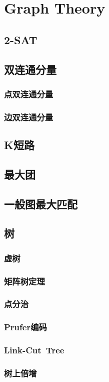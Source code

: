 \chapter{Graph Theory}
\section{2-SAT}
\section{双连通分量}
\subsection{点双连通分量}
\subsection{边双连通分量}
\section{K短路}
\section{最大团}
\section{一般图最大匹配}
\section{树}
\subsection{虚树}
\subsection{矩阵树定理}
\subsection{点分治}
\subsection{Prufer编码}
\subsection{Link-Cut\ Tree}
\subsection{树上倍增}
